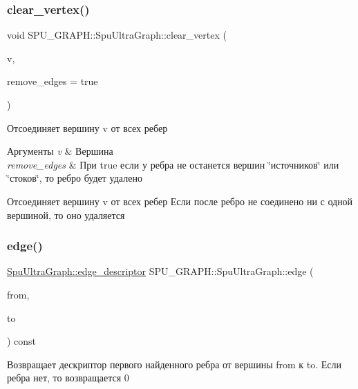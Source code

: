 \subsubsection{\texorpdfstring{clear\+\_\+vertex()}{clear\_vertex()}}
{\footnotesize\ttfamily void S\+P\+U\+\_\+\+G\+R\+A\+P\+H\+::\+Spu\+Ultra\+Graph\+::clear\+\_\+vertex (\begin{DoxyParamCaption}\item[{Spu\+Ultra\+Graph\+::vertex\+\_\+descriptor}]{v,  }\item[{bool}]{remove\+\_\+edges = {\ttfamily true} }\end{DoxyParamCaption})}

Отсоединяет вершину v от всех ребер 
\begin{DoxyParams}{Аргументы}
{\em v} & Вершина \\
\hline
{\em remove\+\_\+edges} & При true если у ребра не останется вершин \char`\"{}источников\char`\"{} или \char`\"{}стоков\char`\"{}, то ребро будет удалено\\
\hline
\end{DoxyParams}
Отсоединяет вершину v от всех ребер Если после ребро не соединено ни с одной вершиной, то оно удаляется \mbox{\label{class_s_p_u___g_r_a_p_h_1_1_spu_ultra_graph_a51468aa2278d3abb0c338ffbeac7747a}} 
\subsubsection{\texorpdfstring{edge()}{edge()}}
{\footnotesize\ttfamily \hyperlink{class_s_p_u___g_r_a_p_h_1_1_spu_ultra_graph_a5f3776e003ef0a1648f1d9f84289810b}{Spu\+Ultra\+Graph\+::edge\+\_\+descriptor} S\+P\+U\+\_\+\+G\+R\+A\+P\+H\+::\+Spu\+Ultra\+Graph\+::edge (\begin{DoxyParamCaption}\item[{vertex\+\_\+descriptor}]{from,  }\item[{vertex\+\_\+descriptor}]{to }\end{DoxyParamCaption}) const}

Возвращает дескриптор первого найденного ребра от вершины from к to. Если ребра нет, то возвращается 0 \mbox{\label{class_s_p_u___g_r_a_p_h_1_1_spu_ultra_graph_a42c69c77768c92f5b4c657289ef1b129}} 
